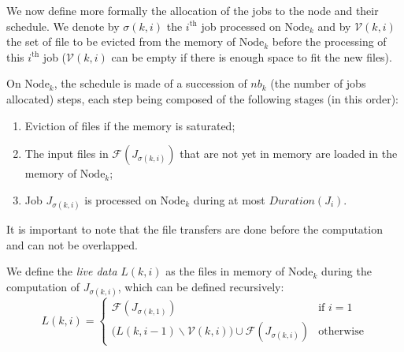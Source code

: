 \documentclass[a4paper]{article}
\newcommand{\Node}[1]{\ensuremath{\mathrm{Node}_{#1}}\xspace}
\newcommand{\inputs}{\ensuremath{\mathcal{F}}\xspace}
\newcommand{\memory}{\ensuremath{\mathcal{M}}\xspace}
\newcommand{\duration}{\mathit{Duration}\xspace}
\newcommand{\jobset}{\ensuremath{\mathbb{J}}\xspace}
\newcommand{\evict}{\ensuremath{\mathcal{V}}\xspace}
\newcommand{\nbloads}{\ensuremath{\mathit{\mathit{Loads}}}\xspace}
\newcommand{\live}{\ensuremath{L}\xspace}
\begin{document}
We now define more formally the allocation of the jobs to the node and
their schedule.
We denote by $\sigma(k,i)$ the $i^\text{th}$ job
processed on $\Node{k}$ and by $\evict(k,i)$ the set of file to
be evicted from the memory of $\Node{k}$ before the processing
of this $i^\text{th}$ job ($\evict(k,i)$ can be empty if there is enough space to fit the new files).

On $\Node{k}$, the schedule is made of a
succession of $\mathit{nb}_k$ (the number of jobs allocated) steps, each step being composed of the
following stages (in this order):
\begin{enumerate}
\item Eviction of files if the memory is saturated; 
\item The input files in $\inputs(J_{\sigma(k,i)})$ that are not yet in memory are loaded in the memory of $\Node{k}$;
\item Job $J_{\sigma(k,i)}$ is processed on $\Node{k}$ during at most $\duration(J_i)$.
\end{enumerate}
It is important to note that the file transfers are done before the computation and can not be overlapped.

We define the \emph{live data} $\live(k,i)$
as the files in memory of $\Node{k}$ during the computation of $J_{\sigma(k,i)}$, which
can be defined recursively:
$$
\live(k,i)=
\begin{cases}
  \inputs(J_{\sigma(k,1)}) & \text{if~}i=1\\
\Big(\live(k,i-1) \backslash \evict(k,i)\Big) \cup \inputs(J_{\sigma(k,i)})
& \text{otherwise}
\end{cases}
$$


\end{document}
